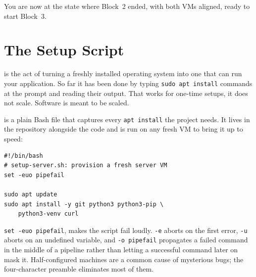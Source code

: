 You are now at the state where Block~2 ended, with both VMs aligned, ready
to start Block~3.


\newpage
\section{The Setup Script}

 is the act of turning a freshly installed
operating system into one that can run your application.
So far it has been done by typing \texttt{sudo apt install} commands at the
prompt and reading their output.
That works for one-time setups, it does not scale.
Software is meant to be scaled.


 is a plain Bash file that captures every
\texttt{apt install} the project needs.
It lives in the repository alongside the code and is run on any fresh VM
to bring it up to speed:

\begin{verbatim}
#!/bin/bash
# setup-server.sh: provision a fresh server VM
set -euo pipefail

sudo apt update
sudo apt install -y git python3 python3-pip \
    python3-venv curl
\end{verbatim}


 \texttt{set -euo pipefail},
makes the script fail loudly.
\texttt{-e} aborts on the first error, \texttt{-u} aborts on an undefined variable,
and \texttt{-o pipefail} propagates a failed command in the middle of a pipeline
rather than letting a successful command later on mask it.
Half-configured machines are a common cause of mysterious bugs;
the four-character preamble eliminates most of them.

